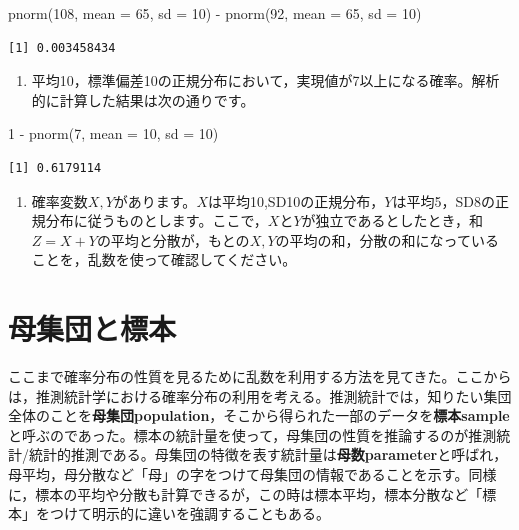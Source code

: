 \documentclass[
  a4paper,
]{ltjsbook}
\newenvironment{Shaded}{\begin{snugshade}}{\end{snugshade}}
\newcommand{\AttributeTok}[1]{\textcolor[rgb]{0.40,0.45,0.13}{#1}}
\newcommand{\DecValTok}[1]{\textcolor[rgb]{0.68,0.00,0.00}{#1}}
\newcommand{\FunctionTok}[1]{\textcolor[rgb]{0.28,0.35,0.67}{#1}}
\newcommand{\NormalTok}[1]{\textcolor[rgb]{0.00,0.23,0.31}{#1}}
\newcommand{\SpecialCharTok}[1]{\textcolor[rgb]{0.37,0.37,0.37}{#1}}
\providecommand{\tightlist}{%
  \setlength{\itemsep}{0pt}\setlength{\parskip}{0pt}}\usepackage{longtable,booktabs,array}
\begin{document}
\begin{Shaded}
\begin{Highlighting}[]
\FunctionTok{pnorm}\NormalTok{(}\DecValTok{108}\NormalTok{, }\AttributeTok{mean =} \DecValTok{65}\NormalTok{, }\AttributeTok{sd =} \DecValTok{10}\NormalTok{) }\SpecialCharTok{{-}} \FunctionTok{pnorm}\NormalTok{(}\DecValTok{92}\NormalTok{, }\AttributeTok{mean =} \DecValTok{65}\NormalTok{, }\AttributeTok{sd =} \DecValTok{10}\NormalTok{)}
\end{Highlighting}
\end{Shaded}

\begin{verbatim}
[1] 0.003458434
\end{verbatim}

\begin{enumerate}
\def\labelenumi{\arabic{enumi}.}
\setcounter{enumi}{3}
\tightlist
\item
  平均10，標準偏差10の正規分布において，実現値が7以上になる確率。解析的に計算した結果は次の通りです。
\end{enumerate}

\begin{Shaded}
\begin{Highlighting}[]
\DecValTok{1} \SpecialCharTok{{-}} \FunctionTok{pnorm}\NormalTok{(}\DecValTok{7}\NormalTok{, }\AttributeTok{mean =} \DecValTok{10}\NormalTok{, }\AttributeTok{sd =} \DecValTok{10}\NormalTok{)}
\end{Highlighting}
\end{Shaded}

\begin{verbatim}
[1] 0.6179114
\end{verbatim}

\begin{enumerate}
\def\labelenumi{\arabic{enumi}.}
\setcounter{enumi}{4}
\tightlist
\item
  確率変数\(X,Y\)があります。\(X\)は平均10,SD10の正規分布，\(Y\)は平均5，SD8の正規分布に従うものとします。ここで，\(X\)と\(Y\)が独立であるとしたとき，和\(Z=X+Y\)の平均と分散が，もとの\(X,Y\)の平均の和，分散の和になっていることを，乱数を使って確認してください。
\end{enumerate}

\section{母集団と標本}\label{ux6bcdux96c6ux56e3ux3068ux6a19ux672c}

ここまで確率分布の性質を見るために乱数を利用する方法を見てきた。ここからは，推測統計学における確率分布の利用を考える。推測統計では，知りたい集団全体のことを\textbf{母集団population}，そこから得られた一部のデータを\textbf{標本sample}と呼ぶのであった。標本の統計量を使って，母集団の性質を推論するのが推測統計/統計的推測である。母集団の特徴を表す統計量は\textbf{母数parameter}と呼ばれ，母平均，母分散など「母」の字をつけて母集団の情報であることを示す。同様に，標本の平均や分散も計算できるが，この時は標本平均，標本分散など「標本」をつけて明示的に違いを強調することもある。
\end{document}
